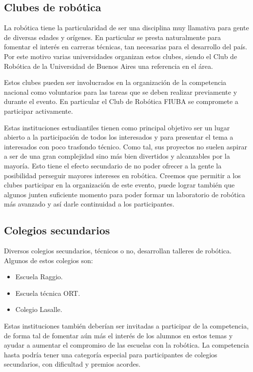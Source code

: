 \documentclass[a4paper,12pt]{article}
\begin{document}
\subsection{Clubes de robótica}

La robótica tiene la particularidad de ser una disciplina muy llamativa para gente de diversas edades y orígenes. En particular se presta naturalmente para fomentar el interés en carreras técnicas, tan necesarias para el desarrollo del país. Por este motivo varias universidades organizan estos clubes, siendo el Club de Robótica de la Universidad de Buenos Aires una referencia en el área.

Estos clubes pueden ser involucrados en la organización de la competencia nacional como voluntarios para las tareas que se deben realizar previamente y durante el evento. En particular el Club de Robótica FIUBA se compromete a participar activamente.

Estas instituciones estudiantiles tienen como principal objetivo ser un lugar abierto a la participación de todos los interesados y para presentar el tema a interesados con poco trasfondo técnico. Como tal, sus proyectos no suelen aspirar a ser de una gran complejidad sino más bien divertidos y alcanzables por la mayoría. Esto tiene el efecto secundario de no poder ofrecer a la gente la posibilidad perseguir mayores intereses en robótica. Creemos que permitir a los clubes participar en la organización de este evento, puede lograr también que algunos junten suficiente momento para poder formar un laboratorio de robótica más avanzado y así darle continuidad a los participantes.

\subsection{Colegios secundarios}

Diversos colegios secundarios, técnicos o no, desarrollan talleres de robótica. Algunos de estos colegios son:

\begin{itemize}
 \item Escuela Raggio.
 \item Escuela técnica ORT.
 \item Colegio Lasalle.
\end{itemize}

Estas instituciones también deberían ser invitadas a participar de la competencia, de forma tal de fomentar aún más el interés de los alumnos en estos temas y ayudar a aumentar el compromiso de las escuelas con la robótica. La competencia hasta podría tener una categoría especial para participantes de colegios secundarios, con dificultad y premios acordes.
\end{document}
